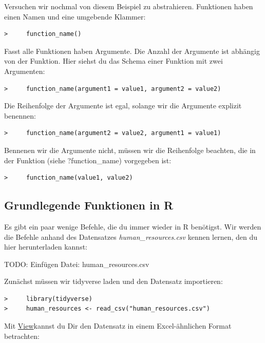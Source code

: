 \documentclass[
]{book}
\begin{document}
Versuchen wir nochmal von diesem Beispiel zu abstrahieren. Funktionen haben einen Namen und eine umgebende Klammer:

\begin{verbatim}
>     function_name()
\end{verbatim}

Fasst alle Funktionen haben Argumente. Die Anzahl der Argumente ist abhängig von der Funktion. Hier siehst du das Schema einer Funktion mit zwei Argumenten:

\begin{verbatim}
>     function_name(argument1 = value1, argument2 = value2)
\end{verbatim}

Die Reihenfolge der Argumente ist egal, solange wir die Argumente explizit benennen:

\begin{verbatim}
>     function_name(argument2 = value2, argument1 = value1)
\end{verbatim}

Bennenen wir die Argumente nicht, müssen wir die Reihenfolge beachten, die in der Funktion (siehe ?function\_name) vorgegeben ist:

\begin{verbatim}
>     function_name(value1, value2)
\end{verbatim}

\hypertarget{grundlegende-funktionen-in-r}{%
\subsection{Grundlegende Funktionen in R}\label{grundlegende-funktionen-in-r}}

Es gibt ein paar wenige Befehle, die du immer wieder in R benötigst. Wir werden die Befehle anhand des Datensatzes \emph{human\_resources.csv} kennen lernen, den du hier herunterladen kannst:

TODO: Einfügen Datei: human\_resources.csv

Zunächst müssen wir tidyverse laden und den Datensatz importieren:

\begin{verbatim}
>     library(tidyverse)
>     human_resources <- read_csv("human_resources.csv")
\end{verbatim}

Mit \href{https://www.rdocumentation.org/packages/utils/versions/3.6.1/topics/View}{View}kannst du Dir den Datensatz in einem Excel-ähnlichen Format betrachten:
\end{document}
